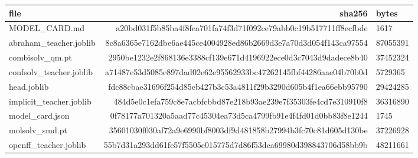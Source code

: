 \begin{tabular}{lrl}
\toprule
file & sha256 & bytes \\
\midrule
MODEL\_CARD.md & a20bd031f5b85ba4f8fea701fa74f3d71f092ce79abb0c19b517711ff8ecfbde & 1617 \\
abraham\_teacher.joblib & 8c8a6365e7162dbe6ae445ce4004928ed86b2669d3e7a70d3d054f143ca97554 & 87055391 \\
combisolv\_qm.pt & 2950be1232e2f868136e3388cf139e671d4196922ece0d3c7043d9dadece8b40 & 37452324 \\
confsolv\_teacher.joblib & a71487e53d5085e897dad02e62e95562933bc47262145fbf44286aae04b70b0d & 5729365 \\
head.joblib & fdc88cbae31696f254d85eb427b3c53a4811f29b3290d605b4f1ea66ebb95790 & 29424285 \\
implicit\_teacher.joblib & 484d5e0c1efa759c8e7acbfcbbd87e218b93ae239e7f35303fe4cd7e310910f8 & 36316890 \\
model\_card.json & 0f78177a701320a5aad77c45304ea73d5ca4799fb91e4f4fd01d0bb83f8e1244 & 1745 \\
molsolv\_smd.pt & 35601030f030af72a9e6990bf8003df9d481858b27994b3fc70c81d605d130be & 37226928 \\
openff\_teacher.joblib & 55b7d31a293dd61fe57f5505e015775d7d86f53dca69980d398843706d58bb9b & 48211661 \\
\bottomrule
\end{tabular}
